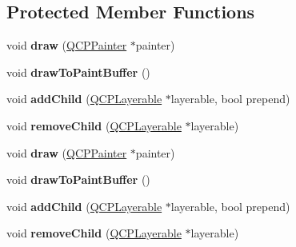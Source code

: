 \subsection*{Protected Member Functions}
\begin{DoxyCompactItemize}
\item 
void {\bfseries draw} (\hyperlink{class_q_c_p_painter}{Q\+C\+P\+Painter} $\ast$painter)\hypertarget{class_q_c_p_layer_ab831a99c8d30b15ec4533ca341e8813b}{}\label{class_q_c_p_layer_ab831a99c8d30b15ec4533ca341e8813b}

\item 
void {\bfseries draw\+To\+Paint\+Buffer} ()\hypertarget{class_q_c_p_layer_a4a8e0a86f31462299e7fc8e8158dd2c6}{}\label{class_q_c_p_layer_a4a8e0a86f31462299e7fc8e8158dd2c6}

\item 
void {\bfseries add\+Child} (\hyperlink{class_q_c_p_layerable}{Q\+C\+P\+Layerable} $\ast$layerable, bool prepend)\hypertarget{class_q_c_p_layer_a57ce5e49364aa9122276d5df3b4a0ddc}{}\label{class_q_c_p_layer_a57ce5e49364aa9122276d5df3b4a0ddc}

\item 
void {\bfseries remove\+Child} (\hyperlink{class_q_c_p_layerable}{Q\+C\+P\+Layerable} $\ast$layerable)\hypertarget{class_q_c_p_layer_ac2f64ac7761650582d968d86670ef362}{}\label{class_q_c_p_layer_ac2f64ac7761650582d968d86670ef362}

\item 
void {\bfseries draw} (\hyperlink{class_q_c_p_painter}{Q\+C\+P\+Painter} $\ast$painter)\hypertarget{class_q_c_p_layer_ab831a99c8d30b15ec4533ca341e8813b}{}\label{class_q_c_p_layer_ab831a99c8d30b15ec4533ca341e8813b}

\item 
void {\bfseries draw\+To\+Paint\+Buffer} ()\hypertarget{class_q_c_p_layer_a4a8e0a86f31462299e7fc8e8158dd2c6}{}\label{class_q_c_p_layer_a4a8e0a86f31462299e7fc8e8158dd2c6}

\item 
void {\bfseries add\+Child} (\hyperlink{class_q_c_p_layerable}{Q\+C\+P\+Layerable} $\ast$layerable, bool prepend)\hypertarget{class_q_c_p_layer_a57ce5e49364aa9122276d5df3b4a0ddc}{}\label{class_q_c_p_layer_a57ce5e49364aa9122276d5df3b4a0ddc}

\item 
void {\bfseries remove\+Child} (\hyperlink{class_q_c_p_layerable}{Q\+C\+P\+Layerable} $\ast$layerable)\hypertarget{class_q_c_p_layer_ac2f64ac7761650582d968d86670ef362}{}\label{class_q_c_p_layer_ac2f64ac7761650582d968d86670ef362}

\end{DoxyCompactItemize}
